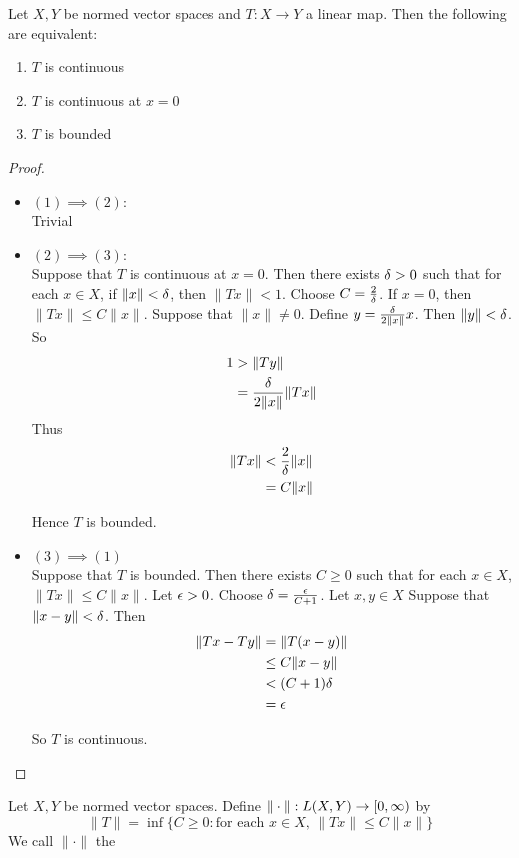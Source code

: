 \documentclass{book}
\begin{document}
	\begin{ex} 
		Let $X,Y$ be normed vector spaces and $T:X \rightarrow Y$ a linear map. Then the following are equivalent:
		\begin{enumerate}
			\item $T$ is continuous
			\item $T$ is continuous at $x=0$
			\item $T$ is bounded
		\end{enumerate}
	\end{ex}
	
	\begin{proof}\
		\begin{itemize}
		\item $(1) \implies (2)$:\\
		Trivial
		\item $(2) \implies (3)$:\\
		Suppose that $T$ is continuous at $x=0$. Then there exists $\delta>0$ such that for each $x \in X$, if $\|x \|< \delta$, then $\|Tx \|< 1$. Choose $C = \frac{2}{\delta}$. If $x=0$, then $\|Tx \|\leq C \|x \|$. Suppose that $\|x \|\neq 0$. Define $y = \frac{\delta}{2 \|x \|}x$. Then $\|y \|< \delta$. So 
		\begin{align*}
		1 
		&> \|Ty \|\\
		&= \frac{\delta}{2 \|x \|} \|Tx \|
		\end{align*}
		Thus 
		\begin{align*}
			\|Tx \|
			&< \frac{2}{\delta} \|x \| \\
			&=C \|x \|
		\end{align*}
		
		Hence $T$ is bounded.
		\item $(3) \implies (1)$\\
		Suppose that $T$ is bounded. Then there exists $C \geq 0$ such that for each $x \in X$, $\|Tx \|\leq C\|x \|$. Let $\epsilon >0$. Choose $\delta = \frac{\epsilon}{C+1}$. Let $x,y \in X$ Suppose that $\|x-y \|< \delta$. Then 
		\begin{align*}
			\|Tx-Ty \|
			& = \|T(x-y) \| \\
			& \leq C \|x-y \|\\
			&< (C+1) \delta\\ 
			&= \epsilon
		\end{align*}
		
		So $T$ is continuous.
		\end{itemize}
	\end{proof}
	
	\begin{defn} 
		Let $X,Y$ be normed vector spaces. Define $\|\cdot\|: L(X,Y)\rightarrow [0,\infty)$ by $$\|T\| = \inf \{C \geq 0: \text{for each }x \in X\text{, } \|Tx \|\leq C\|x\|\}$$ We call $\|\cdot \|$ the 
	\end{defn}
	
\end{document}
